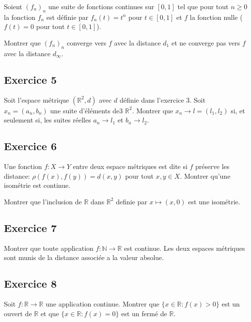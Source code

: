 \documentclass[letterpaper,10pt,french]{sphinxmanual}
\begin{document}
\sphinxAtStartPar
Soient \((f_n)_n\) une suite de fonctions continues sur \([0, 1]\) tel que pour tout \(n\geq 0\) la fonction \(f_n\) est définie par \(f_n(t) = t^n\) pour \(t\in [0, 1]\) et \(f\) la fonction nulle (\(f(t) = 0 \) pour tout \(t\in [0,1]\)).

\sphinxAtStartPar
Montrer que \((f_n)_n\) converge vers \(f\) avec la distance \(d_1\)  et ne converge pas vers \(f\) avec la distance \(d_\infty\).


\subsection{Exercice 5}
\label{\detokenize{exo_fctplsvar:exercice-5}}
\sphinxAtStartPar
Soit l’espace métrique \((\mathbb R^2, d)\) avec \(d\) définie dans l’exercice 3. Soit \(x_n = (a_n , b_n)\) une suite d’éléments de3 \(\mathbb R^2\). Montrer que \(x_n \to l=(l_1, l_2)\) si, et seulement si, les suites réelles \(a_n \to l_1\) et \(b_n \to l_2\).


\subsection{Exercice 6}
\label{\detokenize{exo_fctplsvar:exercice-6}}
\sphinxAtStartPar
Une fonction \(f: X \to Y\) entre deux espace métriques est dite  si \(f\) préserve les distance: \(\rho(f(x),f(y)) = d(x, y)\) pour tout \(x, y \in X\). Montrer qu’une isométrie est continue.

\sphinxAtStartPar
Montrer que l’inclusion de \(\mathbb R\) dans \(\mathbb R^2\) definie par \( x \mapsto (x,0)\) est une isométrie.


\subsection{Exercice 7}
\label{\detokenize{exo_fctplsvar:exercice-7}}
\sphinxAtStartPar
Montrer que toute application \(f: \mathbb N \to \mathbb R\) est continue. Les deux espaces métriques sont munis de la distance associée a la valeur absolue.


\subsection{Exercice 8}
\label{\detokenize{exo_fctplsvar:exercice-8}}
\sphinxAtStartPar
Soit \(f: \mathbb R \to \mathbb R\) une application continue. Montrer que \(\{x\in \mathbb R: f(x)>0\}\) est un ouvert de \(\mathbb R\) et que \(\{x\in \mathbb R: f(x)=0\}\) est un fermé de \(\mathbb R\).







\renewcommand{\indexname}{Index}
\printindex
\end{document}
